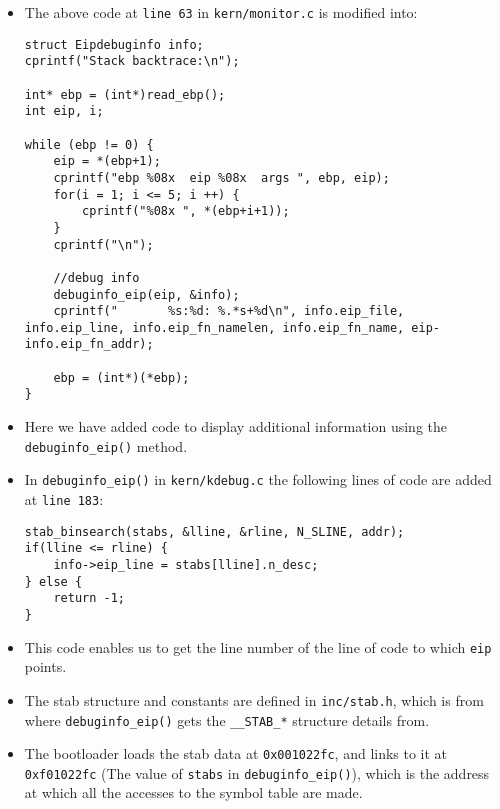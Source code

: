 \documentclass[]{article}
\begin{document}
\begin{itemize}
\item
  The above code at \texttt{line 63} in \texttt{kern/monitor.c} is
  modified into:

\begin{verbatim}
struct Eipdebuginfo info;
cprintf("Stack backtrace:\n");

int* ebp = (int*)read_ebp();
int eip, i;

while (ebp != 0) {
    eip = *(ebp+1);
    cprintf("ebp %08x  eip %08x  args ", ebp, eip);
    for(i = 1; i <= 5; i ++) {
        cprintf("%08x ", *(ebp+i+1));
    }
    cprintf("\n");

    //debug info
    debuginfo_eip(eip, &info);
    cprintf("       %s:%d: %.*s+%d\n", info.eip_file, info.eip_line, info.eip_fn_namelen, info.eip_fn_name, eip-info.eip_fn_addr);

    ebp = (int*)(*ebp);
}
\end{verbatim}
\item
  Here we have added code to display additional information using the
  \texttt{debuginfo\_eip()} method.
\item
  In \texttt{debuginfo\_eip()} in \texttt{kern/kdebug.c} the following
  lines of code are added at \texttt{line 183}:

\begin{verbatim}
stab_binsearch(stabs, &lline, &rline, N_SLINE, addr);
if(lline <= rline) {
    info->eip_line = stabs[lline].n_desc;
} else {
    return -1;
}
\end{verbatim}
\item
  This code enables us to get the line number of the line of code to
  which \texttt{eip} points.
\item
  The stab structure and constants are defined in \texttt{inc/stab.h},
  which is from where \texttt{debuginfo\_eip()} gets the
  \texttt{\_\_STAB\_*} structure details from.
\item
  The bootloader loads the stab data at \texttt{0x001022fc}, and links
  to it at \texttt{0xf01022fc} (The value of \texttt{stabs} in
  \texttt{debuginfo\_eip()}), which is the address at which all the
  accesses to the symbol table are made.
\end{itemize}
\end{document}
